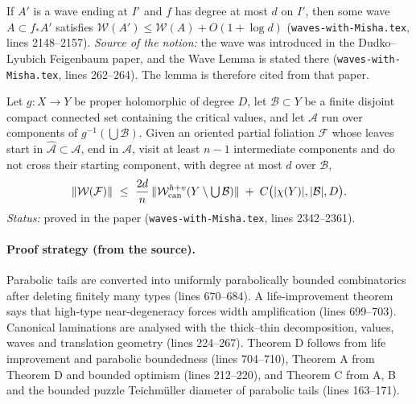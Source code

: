 \begin{theorem}
\label{thm:kkl-wave}
If $A'$ is a wave ending at $I'$ and $f$ has degree at most $d$ on $I'$, then some wave $A\subset f_*A'$ satisfies
$\mathcal W(A')\le\mathcal W(A)+O(1+\log d)$ (\texttt{waves-with-Misha.tex}, lines 2148--2157).  \emph{Source of the
notion:} the wave was introduced in the Dudko--Lyubich Feigenbaum paper, and the Wave Lemma is stated there
(\texttt{waves-with-Misha.tex}, lines 262--264).  The lemma is therefore cited from that paper.
\end{theorem}

\begin{theorem}
\label{thm:kkl-wanderers}
Let $g\colon X\to Y$ be proper holomorphic of degree $D$, let $\mathcal B\subset Y$ be a finite disjoint compact connected
set containing the critical values, and let $\mathcal A$ run over components of $g^{-1}(\bigcup\mathcal B)$.  Given an
oriented partial foliation $\mathcal F$ whose leaves start in $\widehat{\mathcal A}\subset\mathcal A$, end in $\mathcal A$,
visit at least $n-1$ intermediate components and do not cross their starting component, with degree at most $d$ over
$\mathcal B$,
\[
\|\mathcal W(\mathcal F)\|\ \le\ \frac{2d}{n}\,\|\mathcal W^{h+v}_{\rm can}(Y\setminus\textstyle\bigcup\mathcal B)\|
\;+\;C\bigl(|\chi(Y)|,|\mathcal B|,D\bigr).
\]
\emph{Status:} proved in the paper (\texttt{waves-with-Misha.tex}, lines 2342--2361).
\end{theorem}

\paragraph{Proof strategy (from the source).}
Parabolic tails are converted into uniformly parabolically bounded combinatorics after deleting finitely many types
(lines 670--684).  A life-improvement theorem says that high-type near-degeneracy forces width amplification
(lines 699--703).  Canonical laminations are analysed with the thick--thin decomposition, values, waves and translation
geometry (lines 224--267).  Theorem D follows from life improvement and parabolic boundedness (lines 704--710), Theorem A
from Theorem D and bounded optimism (lines 212--220), and Theorem C from A, B and the bounded puzzle Teichm\"uller diameter
of parabolic tails (lines 163--171).

